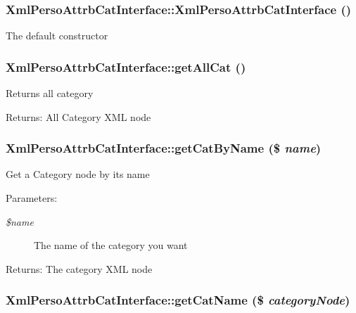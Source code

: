 \subsubsection{\setlength{\rightskip}{0pt plus 5cm}XmlPersoAttrbCatInterface::XmlPersoAttrbCatInterface ()}\label{classXmlPersoAttrbCatInterface_7552a1ed7a232dceeee732f7a4068e2f}


The default constructor 
\subsubsection{\setlength{\rightskip}{0pt plus 5cm}XmlPersoAttrbCatInterface::getAllCat ()}\label{classXmlPersoAttrbCatInterface_77a5b1c08d0ae94b1cd92bc4ec36abae}


Returns all category

\begin{Desc}
\item[Returns:]All Category XML node \end{Desc}
\subsubsection{\setlength{\rightskip}{0pt plus 5cm}XmlPersoAttrbCatInterface::getCatByName (\$ {\em name})}\label{classXmlPersoAttrbCatInterface_091754a135b14f24da18dbd226b70c87}


Get a Category node by its name

\begin{Desc}
\item[Parameters:]
\begin{description}
\item[{\em \$name}]The name of the category you want\end{description}
\end{Desc}
\begin{Desc}
\item[Returns:]The category XML node \end{Desc}
\subsubsection{\setlength{\rightskip}{0pt plus 5cm}XmlPersoAttrbCatInterface::getCatName (\$ {\em categoryNode})}\label{classXmlPersoAttrbCatInterface_dc26dd60948b98fed10f25970bb8d7a0}


